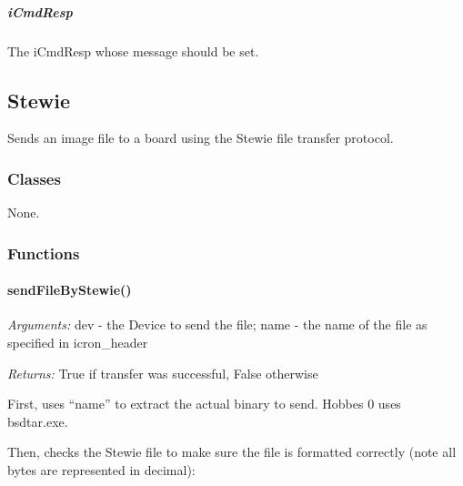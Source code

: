 \documentclass[12pt,letterpaper]{article}
\begin{document}
\setcounter{subparagraph}{-1}



%
%
\subparagraph{iCmdResp}
\label{4.7.2.5.0}

The iCmdResp whose message should be set.



%
%
\subsection{Stewie}
\label{4.8}

Sends an image file to a board using the Stewie file transfer protocol.

\setcounter{subsubsection}{-1}



%
%
\subsubsection{Classes}
\label{4.8.0}

None.



%
%
\subsubsection{Functions}
\label{4.8.1}

\setcounter{paragraph}{-1}



%
%
\paragraph{sendFileByStewie()}
\label{4.8.1.0}

\emph{Arguments:} dev - the Device to send the file; name - the name of the file as specified in icron\_header

\emph{Returns:} True if transfer was successful, False otherwise

First, uses ``name'' to extract the actual binary to send. Hobbes 0 uses bsdtar.exe.

Then, checks the Stewie file to make sure the file is formatted correctly (note all bytes are represented in decimal):
\end{document}
